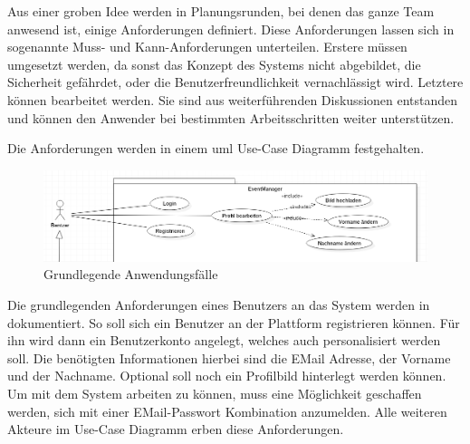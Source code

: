 
\label{ucSection}

Aus einer groben Idee werden in Planungsrunden, bei denen das ganze Team anwesend ist, einige Anforderungen definiert. Diese Anforderungen lassen sich in sogenannte Muss- und Kann-Anforderungen unterteilen. Erstere müssen umgesetzt werden, da sonst das Konzept des Systems nicht abgebildet, die Sicherheit gefährdet, oder die Benutzerfreundlichkeit vernachlässigt wird. Letztere können bearbeitet werden. Sie sind aus weiterführenden Diskussionen entstanden und können den Anwender bei bestimmten Arbeitsschritten weiter unterstützen.

Die Anforderungen werden in einem \gls{uml} Use-Case Diagramm festgehalten.

\begin{figure}[ht]
\centering
\includegraphics[width=\textwidth]{res/images/UseCaseUser.png}
\caption{Grundlegende Anwendungsfälle}
\label{uc1}
\end{figure}

Die grundlegenden Anforderungen eines Benutzers an das System werden in  dokumentiert. So soll sich ein Benutzer an der Plattform registrieren können. Für ihn wird dann ein Benutzerkonto angelegt, welches auch personalisiert werden soll. Die benötigten Informationen hierbei sind die EMail Adresse, der Vorname und der Nachname. Optional soll noch ein Profilbild hinterlegt werden können. Um mit dem System arbeiten zu können, muss eine Möglichkeit geschaffen werden, sich mit einer EMail-Passwort Kombination anzumelden. Alle weiteren Akteure im Use-Case Diagramm erben diese Anforderungen. \newpage

